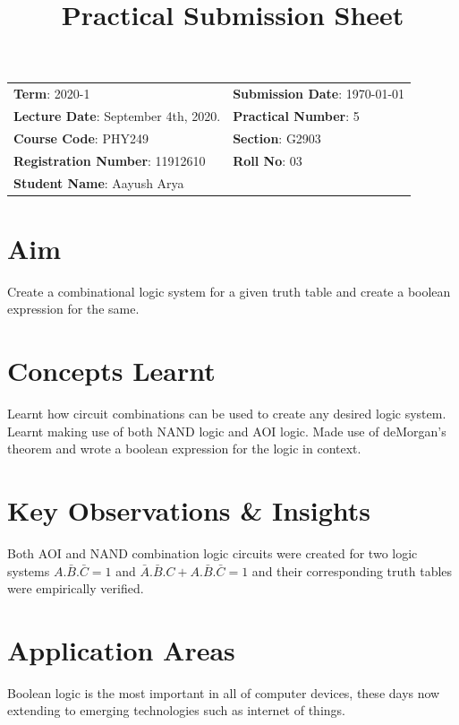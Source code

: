 \documentclass{article}
\title{Practical Submission Sheet}
\date{}
\newcommand{\bb}[1]{\textbf{#1}}
\begin{document}
	\maketitle
	\begin{tabular}{ll}
		\bb{Term}: 2020-1 & \bb{Submission Date}: \today\\
		\bb{Lecture Date}: September 4th, 2020. & \bb{Practical Number}: 5\\
		\bb{Course Code}: PHY249 & \bb{Section}: G2903\\
		\bb{Registration Number}: 11912610 & \bb{Roll No}: 03\\
		\bb{Student Name}: Aayush Arya & \\
	\end{tabular}
	
	\section*{Aim} Create a combinational logic system for a given truth table and create a boolean expression for the same.
	
	\section*{Concepts Learnt}
	Learnt how circuit combinations can be used to create any desired logic system. Learnt making use of both NAND logic and AOI logic. Made use of deMorgan's theorem and wrote a boolean expression for the logic in context.
	
	\section*{Key Observations \& Insights}
	Both AOI and NAND combination logic circuits were created for two logic systems $ A. \bar{B} .\bar{C} = 1$ and $\bar{A}.\bar{B}.C + A.\bar{B}.\bar{C} = 1$ and their corresponding truth tables were empirically verified.
	
	\section*{Application Areas}
	Boolean logic is the most important in all of computer devices, these days now extending to emerging technologies such as internet of things. 
\end{document}
